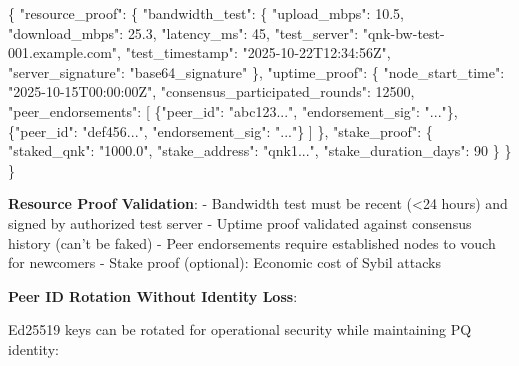 \documentclass[
  11pt,
]{article}
\newenvironment{Shaded}{\begin{snugshade}}{\end{snugshade}}
\newcommand{\DataTypeTok}[1]{\textcolor[rgb]{0.13,0.29,0.53}{#1}}
\newcommand{\DecValTok}[1]{\textcolor[rgb]{0.00,0.00,0.81}{#1}}
\newcommand{\FloatTok}[1]{\textcolor[rgb]{0.00,0.00,0.81}{#1}}
\newcommand{\FunctionTok}[1]{\textcolor[rgb]{0.00,0.00,0.00}{#1}}
\newcommand{\OtherTok}[1]{\textcolor[rgb]{0.56,0.35,0.01}{#1}}
\newcommand{\StringTok}[1]{\textcolor[rgb]{0.31,0.60,0.02}{#1}}
\begin{document}
\begin{Shaded}
\begin{Highlighting}[]
\FunctionTok{\{}
  \DataTypeTok{"resource\_proof"}\FunctionTok{:} \FunctionTok{\{}
    \DataTypeTok{"bandwidth\_test"}\FunctionTok{:} \FunctionTok{\{}
      \DataTypeTok{"upload\_mbps"}\FunctionTok{:} \FloatTok{10.5}\FunctionTok{,}
      \DataTypeTok{"download\_mbps"}\FunctionTok{:} \FloatTok{25.3}\FunctionTok{,}
      \DataTypeTok{"latency\_ms"}\FunctionTok{:} \DecValTok{45}\FunctionTok{,}
      \DataTypeTok{"test\_server"}\FunctionTok{:} \StringTok{"qnk{-}bw{-}test{-}001.example.com"}\FunctionTok{,}
      \DataTypeTok{"test\_timestamp"}\FunctionTok{:} \StringTok{"2025{-}10{-}22T12:34:56Z"}\FunctionTok{,}
      \DataTypeTok{"server\_signature"}\FunctionTok{:} \StringTok{"base64\_signature"}
    \FunctionTok{\},}
    \DataTypeTok{"uptime\_proof"}\FunctionTok{:} \FunctionTok{\{}
      \DataTypeTok{"node\_start\_time"}\FunctionTok{:} \StringTok{"2025{-}10{-}15T00:00:00Z"}\FunctionTok{,}
      \DataTypeTok{"consensus\_participated\_rounds"}\FunctionTok{:} \DecValTok{12500}\FunctionTok{,}
      \DataTypeTok{"peer\_endorsements"}\FunctionTok{:} \OtherTok{[}
        \FunctionTok{\{}\DataTypeTok{"peer\_id"}\FunctionTok{:} \StringTok{"abc123..."}\FunctionTok{,} \DataTypeTok{"endorsement\_sig"}\FunctionTok{:} \StringTok{"..."}\FunctionTok{\}}\OtherTok{,}
        \FunctionTok{\{}\DataTypeTok{"peer\_id"}\FunctionTok{:} \StringTok{"def456..."}\FunctionTok{,} \DataTypeTok{"endorsement\_sig"}\FunctionTok{:} \StringTok{"..."}\FunctionTok{\}}
      \OtherTok{]}
    \FunctionTok{\},}
    \DataTypeTok{"stake\_proof"}\FunctionTok{:} \FunctionTok{\{}
      \DataTypeTok{"staked\_qnk"}\FunctionTok{:} \StringTok{"1000.0"}\FunctionTok{,}
      \DataTypeTok{"stake\_address"}\FunctionTok{:} \StringTok{"qnk1..."}\FunctionTok{,}
      \DataTypeTok{"stake\_duration\_days"}\FunctionTok{:} \DecValTok{90}
    \FunctionTok{\}}
  \FunctionTok{\}}
\FunctionTok{\}}
\end{Highlighting}
\end{Shaded}

\textbf{Resource Proof Validation}: - Bandwidth test must be recent
(\textless24 hours) and signed by authorized test server - Uptime proof
validated against consensus history (can't be faked) - Peer endorsements
require established nodes to vouch for newcomers - Stake proof
(optional): Economic cost of Sybil attacks

\textbf{Peer ID Rotation Without Identity Loss}:

Ed25519 keys can be rotated for operational security while maintaining
PQ identity:
\end{document}
